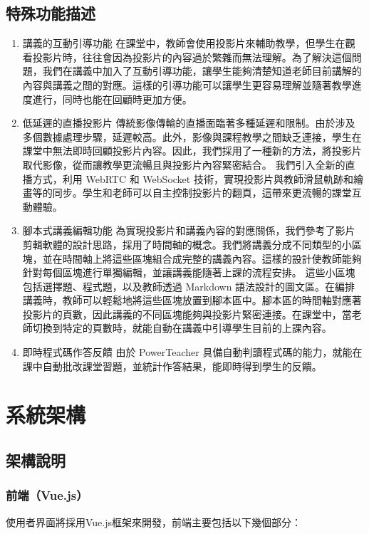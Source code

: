 \documentclass[12pt]{article}
\begin{document}
\subsection{特殊功能描述}
\begin{enumerate}[label=(\arabic*)]
  \item 講義的互動引導功能
  在課堂中，教師會使用投影片來輔助教學，但學生在觀看投影片時，往往會因為投影片的內容過於繁雜而無法理解。為了解決這個問題，我們在講義中加入了互動引導功能，讓學生能夠清楚知道老師目前講解的內容與講義之間的對應。這樣的引導功能可以讓學生更容易理解並隨著教學進度進行，同時也能在回顧時更加方便。
  \item 低延遲的直播投影片
  傳統影像傳輸的直播面臨著多種延遲和限制。由於涉及多個數據處理步驟，延遲較高。此外，影像與課程教學之間缺乏連接，學生在課堂中無法即時回顧投影片內容。因此，我們採用了一種新的方法，將投影片取代影像，從而讓教學更流暢且與投影片內容緊密結合。
  我們引入全新的直播方式，利用 WebRTC 和 WebSocket 技術，實現投影片與教師滑鼠軌跡和繪畫等的同步。學生和老師可以自主控制投影片的翻頁，這帶來更流暢的課堂互動體驗。
  \item 腳本式講義編輯功能
  為實現投影片和講義內容的對應關係，我們參考了影片剪輯軟體的設計思路，採用了時間軸的概念。我們將講義分成不同類型的小區塊，並在時間軸上將這些區塊組合成完整的講義內容。這樣的設計使教師能夠針對每個區塊進行單獨編輯，並讓講義能隨著上課的流程安排。
  這些小區塊包括選擇題、程式題，以及教師透過 Markdown 語法設計的圖文區。在編排講義時，教師可以輕鬆地將這些區塊放置到腳本區中。腳本區的時間軸對應著投影片的頁數，因此講義的不同區塊能夠與投影片緊密連接。在課堂中，當老師切換到特定的頁數時，就能自動在講義中引導學生目前的上課內容。
  \item 即時程式碼作答反饋
  由於 PowerTeacher 具備自動判讀程式碼的能力，就能在課中自動批改課堂習題，並統計作答結果，能即時得到學生的反饋。
\end{enumerate}

\section{系統架構}

\subsection{架構說明}

\subsubsection{前端（Vue.js）}
使用者界面將採用Vue.js框架來開發，前端主要包括以下幾個部分：
\end{document}
